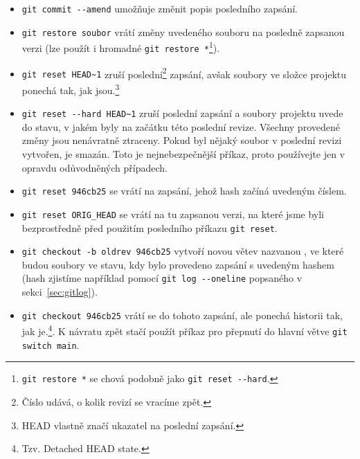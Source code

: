 \documentclass[a4paper,11pt,twoside]{article}
\def\code#1{\textnormal{\texttt{#1}}}
\theoremstyle{red}
\theoremstyle{green}
\begin{document}
    \begin{itemize}
        \item \code{git commit -{}-amend} umožňuje změnit popis posledního zapsání.
        \item \code{git restore soubor} vrátí změny uvedeného souboru na posledně zapsanou verzi (lze použít i hromadné \code{git restore *}\footnote{\code{git restore *} se chová podobně jako \code{git reset -{}-hard}.}).
        \item \code{git reset HEAD\~{}1} zruší poslední\footnote{Číslo udává, o kolik revizí se vracíme zpět.} zapsání, avšak soubory ve složce projektu ponechá tak, jak jsou.\footnote{HEAD vlastně značí ukazatel na poslední zapsání.}
        \item \code{git reset -{}-hard HEAD\~{}1} zruší poslední zapsání a soubory projektu uvede do stavu, v jakém byly na začátku této poslední revize. 
        Všechny provedené změny jsou nenávratně ztraceny.
        Pokud byl nějaký soubor v poslední revizi vytvořen, je smazán.
        Toto je nejnebezpečnější příkaz, proto používejte jen v opravdu odůvodněných případech.
        \item \code{git reset 946cb25} se vrátí na zapsání, jehož hash začíná uvedeným číslem.
        \item \code{git reset ORIG_HEAD} se vrátí na tu zapsanou verzi, na které jsme byli bezprostředně před použitím posledního příkazu \code{git reset}.
        \item \code{git checkout -b oldrev 946cb25} vytvoří novou větev nazvanou , ve které budou soubory ve stavu, kdy bylo provedeno zapsání s uvedeným hashem (hash zjistíme například pomocí \code{git log -{}-oneline} popsaného v sekci~\ref{sec:gitlog}).
        \item \code{git checkout 946cb25} vrátí se do tohoto zapsání, ale ponechá historii tak, jak je.\footnote{Tzv. Detached HEAD state.}.
            K návratu zpět stačí použít příkaz pro přepnutí do hlavní větve \code{git switch main}.
    \end{itemize}
\end{document}
